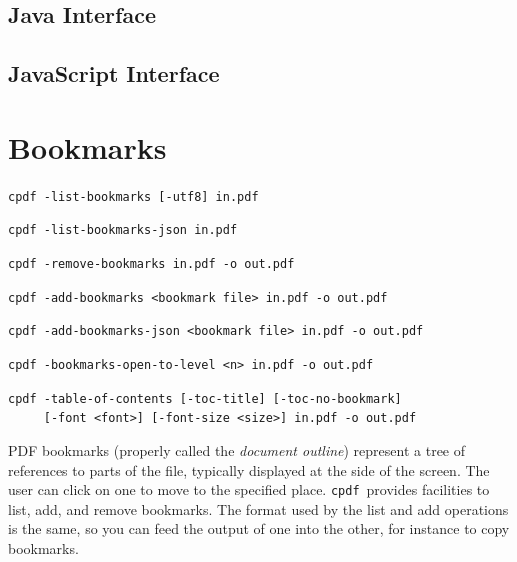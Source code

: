 \documentclass{book}
\newcommand{\cpdf}{\texttt{cpdf}}
\begin{document}
\begin{jcpdflib}
\clearpage
\section*{Java Interface}
\begin{small}\tt

\end{small}
\end{jcpdflib}

\begin{jscpdflib}
\clearpage
\section*{JavaScript Interface}
\begin{small}\tt

\end{small}
\end{jscpdflib}

\chapter{Bookmarks}\label{chap:6}
  \begin{framed}
  \small\noindent\verb!cpdf -list-bookmarks [-utf8] in.pdf!

  \vspace{1.5mm}
  \small\noindent\verb!cpdf -list-bookmarks-json in.pdf!

  \vspace{1.5mm}
  \small\noindent\verb!cpdf -remove-bookmarks in.pdf -o out.pdf!

  \vspace{1.5mm}
  \small\noindent\verb!cpdf -add-bookmarks <bookmark file> in.pdf -o out.pdf!

  \vspace{1.5mm}
  \small\noindent\verb!cpdf -add-bookmarks-json <bookmark file> in.pdf -o out.pdf!

  \vspace{1.5mm}
  \small\noindent\verb!cpdf -bookmarks-open-to-level <n> in.pdf -o out.pdf!

  \vspace{1.5mm}
  \small\noindent\verb!cpdf -table-of-contents [-toc-title] [-toc-no-bookmark]!\\
  \small\noindent\verb!     [-font <font>] [-font-size <size>] in.pdf -o out.pdf!

  \end{framed}
  PDF bookmarks (properly called the \textit{document outline}) represent a tree
of references to parts of the file, typically displayed at the side of the
screen. The user can click on one to move to the specified place. \cpdf\ provides
facilities to list, add, and remove bookmarks. The format used by the list and
add operations is the same, so you can feed the output of one into the other,
for instance to copy bookmarks.
\end{document}
